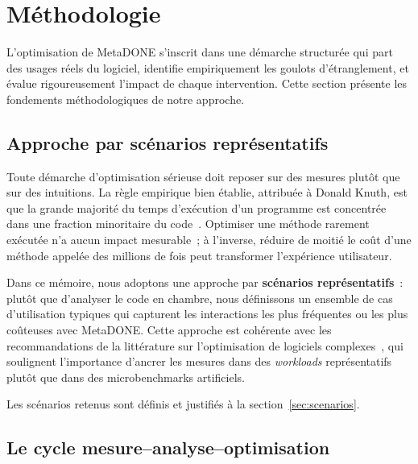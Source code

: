 \chapter{Méthodologie}
\label{chap:methodologie}

L'optimisation de MetaDONE s'inscrit dans une démarche structurée qui part des usages réels du logiciel, identifie empiriquement les goulots d'étranglement, et évalue rigoureusement l'impact de chaque intervention. Cette section présente les fondements méthodologiques de notre approche.

\section{Approche par scénarios représentatifs}

Toute démarche d'optimisation sérieuse doit reposer sur des mesures plutôt que sur des intuitions. La règle empirique bien établie, attribuée à Donald Knuth, est que la grande majorité du temps d'exécution d'un programme est concentrée dans une fraction minoritaire du code~\cite{knuth1974structured}. Optimiser une méthode rarement exécutée n'a aucun impact mesurable~; à l'inverse, réduire de moitié le coût d'une méthode appelée des millions de fois peut transformer l'expérience utilisateur.

Dans ce mémoire, nous adoptons une approche par \textbf{scénarios représentatifs}~: plutôt que d'analyser le code en chambre, nous définissons un ensemble de cas d'utilisation typiques qui capturent les interactions les plus fréquentes ou les plus coûteuses avec MetaDONE. Cette approche est cohérente avec les recommandations de la littérature sur l'optimisation de logiciels complexes~\cite{oaks2014java, arcelli2018performance}, qui soulignent l'importance d'ancrer les mesures dans des \textit{workloads} représentatifs
plutôt que dans des microbenchmarks artificiels.

Les scénarios retenus sont définis et justifiés à la
section~\ref{sec:scenarios}.

\section{Le cycle mesure–analyse–optimisation}
\label{sec:cycle}

